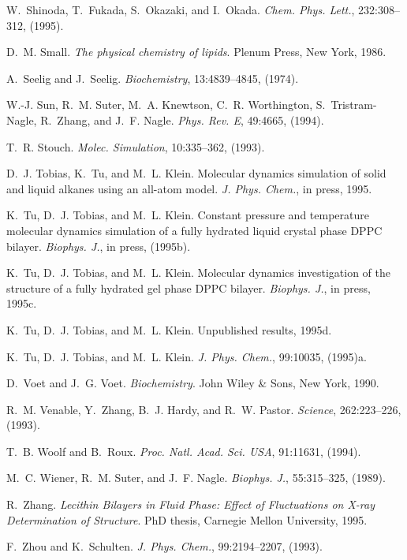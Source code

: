 W.~Shinoda, T.~Fukada, S.~Okazaki, and I.~Okada.
{\em Chem. Phys. Lett.}, 232:308--312, (1995).

D.~M. Small.
{\em The physical chemistry of lipids}.
Plenum Press, New York, 1986.

A.~Seelig and J.~Seelig.
{\em Biochemistry}, 13:4839--4845, (1974).

W.-J. Sun, R.~M. Suter, M.~A. Knewtson, C.~R. Worthington, S.~Tristram-Nagle,
  R.~Zhang, and J.~F. Nagle.
{\em Phys. Rev. E}, 49:4665, (1994).

T.~R. Stouch.
{\em Molec. Simulation}, 10:335--362, (1993).

D.~J. Tobias, K.~Tu, and M.~L. Klein.
Molecular dynamics simulation of solid and liquid alkanes using an
  all-atom model.
{\em J. Phys. Chem.}, in press, 1995.

K.~Tu, D.~J. Tobias, and M.~L. Klein.
Constant pressure and temperature molecular dynamics simulation of a
  fully hydrated liquid crystal phase DPPC bilayer. {\em Biophys. J.}, in
  press, (1995b). 

K.~Tu, D.~J. Tobias, and M.~L. Klein.
Molecular dynamics investigation of the structure of a fully hydrated
  gel phase DPPC bilayer. {\em Biophys. J.}, in press, 1995c.

K.~Tu, D.~J. Tobias, and M.~L. Klein.
Unpublished results, 1995d.

K.~Tu, D.~J. Tobias, and M.~L. Klein.
{\em J. Phys. Chem.}, 99:10035, (1995)a.

D.~Voet and J.~G. Voet.
{\em Biochemistry}.
John Wiley \& Sons, New York, 1990.

R.~M. Venable, Y.~Zhang, B.~J. Hardy, and R.~W. Pastor.
{\em Science}, 262:223--226, (1993).

T.~B. Woolf and B.~Roux.
{\em Proc. Natl. Acad. Sci. USA}, 91:11631, (1994).

M.~C. Wiener, R.~M. Suter, and J.~F. Nagle.
{\em Biophys. J.}, 55:315--325, (1989).

R.~Zhang.
{\em Lecithin Bilayers in Fluid Phase: Effect of Fluctuations on
  X-ray Determination of Structure}.
PhD thesis, Carnegie Mellon University, 1995.

F.~Zhou and K.~Schulten.
{\em J. Phys. Chem.}, 99:2194--2207, (1993).



